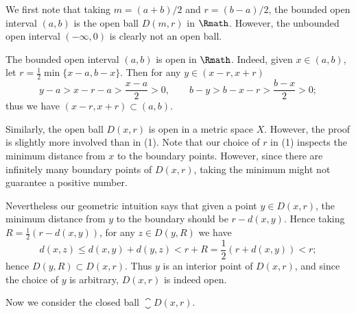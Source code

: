 \begin{example}
    \label{exm:opcl}
    We first note that
    taking \(m=(a+b)/2\) and \(r=(b-a)/2\),
    the bounded open interval \((a,b)\)
    is the open ball \(D(m,r)\) in \(\Rmath\).
    However, the unbounded open interval \((-\infty,0)\)
    is clearly not an open ball.
    \begin{nlist}
        \item The bounded open interval \((a,b)\) is open in \(\Rmath\).
        Indeed, given \(x\in(a,b)\),
        let \(r=\frac{1}{2}\min\{x-a,b-x\}\).
        Then for any \(y\in(x-r,x+r)\)
        \[
            y-a
            >x-r-a
            >\frac{x-a}{2}
            >0,
            \qquad
            b-y
            >b-x-r
            >\frac{b-x}{2}
            >0;
        \]
        thus we have \((x-r,x+r)\subset(a,b)\).
        
        \item Similarly,
        the open ball \(D(x,r)\) is open in a metric space \(X\).
        However, the proof is slightly more involved than in (1).
        Note that
        our choice of \(r\) in (1) inspects the minimum distance
        from \(x\) to the boundary points.
        However,
        since there are infinitely many boundary points of \(D(x,r)\),
        taking the minimum might not guarantee a positive number.
        
        Nevertheless our geometric intuition says that
        given a point \(y\in D(x,r)\),
        the minimum distance from \(y\) to the boundary
        should be \(r-d(x,y)\).
        Hence taking \(R=\frac{1}{2}(r-d(x,y))\),
        for any \(z\in D(y,R)\) we have
        \[
            d(x,z)
            \le d(x,y)+d(y,z)
            <r+R
            =\frac{1}{2}(r+d(x,y))
            <r;
        \]
        hence \(D(y,R)\subset D(x,r)\).
        Thus \(y\) is an interior point of \(D(x,r)\),
        and since the choice of \(y\) is arbitrary,
        \(D(x,r)\) is indeed open.

        \item Now we consider the closed ball \(\closure D(x,r)\).
    \end{nlist}
\end{example}
